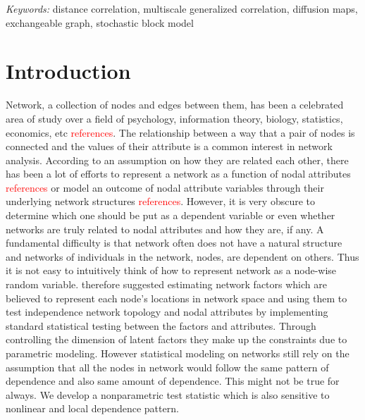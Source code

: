 \documentclass[12pt]{article}
\theoremstyle{definition}
\begin{document}
	\noindent%
	{\it Keywords:} distance correlation, multiscale generalized correlation, diffusion maps, exchangeable graph, stochastic block model 
	\vfill
	
	\newpage
	\section{Introduction}
	\label{sec:intro}
	
	Network, a collection of nodes and edges between them, has been a celebrated area of study over a field of psychology, information theory, biology, statistics, economics, etc \textcolor{red}{references}. The relationship between a way that a pair of nodes is connected and the values of their attribute is a common interest in network analysis. According to an assumption on how they are related each other, there has been a lot of efforts to represent a network as a function of nodal attributes \textcolor{red}{references} or model an outcome of nodal attribute variables through their underlying network structures \textcolor{red}{references}. However, it is very obscure to determine which one should be put as a dependent variable or even whether networks are truly related to nodal attributes and how they are, if any. A fundamental difficulty is that network often does not have a natural structure and networks of individuals in the network, nodes, are dependent on others. Thus it is not easy to intuitively think of how to represent network as a node-wise random variable. \cite{fosdick2015testing} therefore suggested estimating network factors which are believed to represent each node's locations in network space and using them to test independence network topology and nodal attributes by implementing standard statistical testing between the factors and attributes. Through controlling the dimension of latent factors they make up the constraints due to parametric modeling. However statistical modeling on networks still rely on the assumption that all the nodes in network would follow the same pattern of dependence and also same amount of dependence. This might not be true for always. We develop a nonparametric test statistic which is also sensitive to nonlinear and local dependence pattern.  
	
\end{document}

